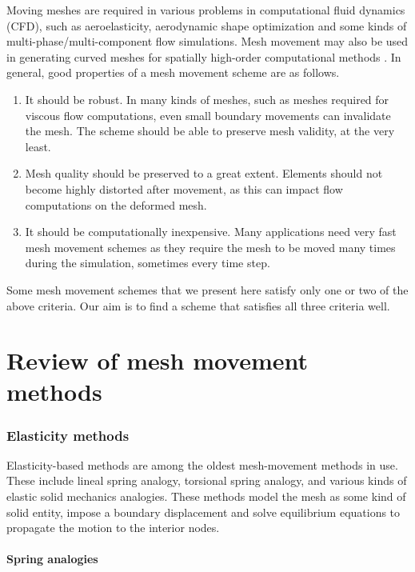 \documentclass[11pt, ms, onehalfspacing]{ncsuthesis}
\begin{document}
Moving meshes are required in various problems in computational fluid dynamics (CFD), such as aeroelasticity, aerodynamic shape optimization \cite{appl:opt} and some kinds of multi-phase/multi-component flow simulations. Mesh movement may also be used in generating curved meshes for spatially high-order computational methods \cite{curve:persson}. In general, good properties of a mesh movement scheme are as follows.
\begin{enumerate}
\item It should be robust. In many kinds of meshes, such as meshes required for viscous flow computations, even small boundary movements can invalidate the mesh. The scheme should be able to preserve mesh validity, at the very least.
\item Mesh quality should be preserved to a great extent. Elements should not become highly distorted after movement, as this can impact flow computations on the deformed mesh.
\item It should be computationally inexpensive. Many applications need very fast mesh movement schemes as they require the mesh to be moved many times during the simulation, sometimes every time step.
\end{enumerate}
Some mesh movement schemes that we present here satisfy only one or two of the above criteria. Our aim is to find a scheme that satisfies all three criteria well.

\chapter{Review of mesh movement methods}

\subsection{Elasticity methods}
Elasticity-based methods are among the oldest mesh-movement methods in use. These include lineal spring analogy, torsional spring analogy, and various kinds of elastic solid mechanics analogies. These methods model the mesh as some kind of solid entity, impose a boundary displacement and solve equilibrium equations to propagate the motion to the interior nodes.

\subsubsection{Spring analogies}
\end{document}
